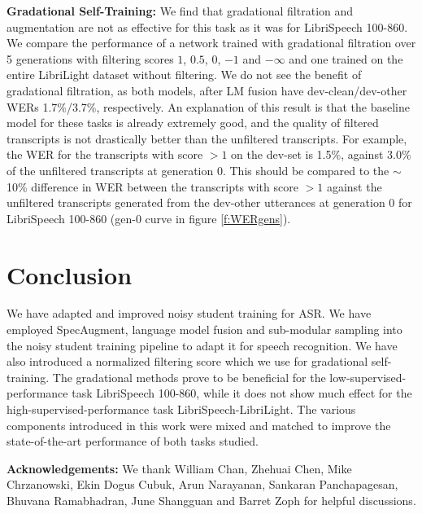 \documentclass[a4paper]{article}
\begin{document}
\noindent\textbf{Gradational Self-Training:} We find that gradational filtration and augmentation are not as effective for this task as it was for LibriSpeech 100-860. We compare the performance of a network trained with gradational filtration over 5 generations with filtering scores $1$, $0.5$, $0$, $-1$ and $-\infty$ and one trained on the entire LibriLight dataset without filtering. We do not see the benefit of gradational filtration, as both models, after LM fusion have dev-clean/dev-other WERs 1.7\%/3.7\%, respectively. An explanation of this result is that the baseline model for these tasks is already extremely good, and the quality of filtered transcripts is not drastically better than the unfiltered transcripts. For example, the WER for the transcripts with score $> 1$ on the dev-set is 1.5\%, against 3.0\% of the unfiltered transcripts at generation 0. This should be compared to the $\sim$ 10\% difference in WER between the transcripts with score $> 1$ against the unfiltered transcripts generated from the dev-other utterances at generation 0 for LibriSpeech 100-860 (gen-0 curve in figure \ref{f:WERgens}).

\section{Conclusion}

We have adapted and improved noisy student training for ASR. We have employed SpecAugment, language model fusion and sub-modular sampling into the noisy student training pipeline to adapt it for speech recognition. We have also introduced a normalized filtering score which we use for gradational self-training. The gradational methods prove to be beneficial for the low-supervised-performance task LibriSpeech 100-860, while it does not show much effect for the high-supervised-performance task LibriSpeech-LibriLight. The various components introduced in this work were mixed and matched to improve the state-of-the-art performance of both tasks studied.
\smallskip

\noindent\textbf{Acknowledgements:} We thank William Chan, Zhehuai Chen, Mike Chrzanowski, Ekin Dogus Cubuk, Arun Narayanan, Sankaran Panchapagesan, Bhuvana Ramabhadran, June Shangguan and Barret Zoph for helpful discussions.




\end{document}
